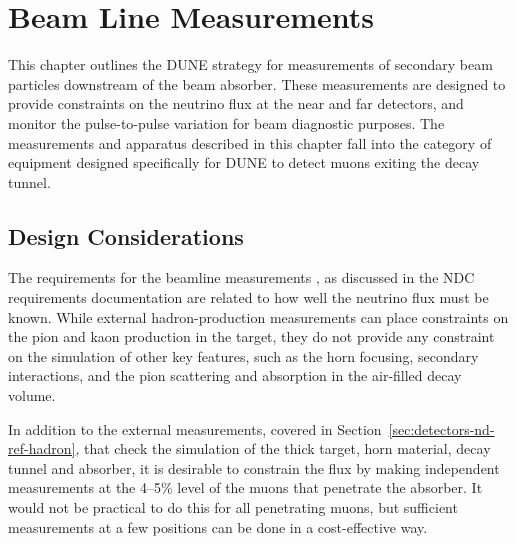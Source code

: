 \section{Beam Line Measurements} 
\label{sec:detectors-nd-ref-blm}

This chapter outlines the DUNE strategy for measurements of secondary
beam particles downstream of  the beam absorber. 
These measurements are designed to provide constraints 
on the neutrino flux at the near and far
detectors, and monitor the pulse-to-pulse variation
 for beam diagnostic purposes. 
The measurements and apparatus described in this chapter fall into
the category of equipment designed specifically for DUNE to
detect muons exiting the decay tunnel. 

\subsection{Design Considerations}
\label{subsec:detectors-nd-blm-design}

The requirements for the beamline measurements
%
, as discussed in the NDC requirements documentation\cite{lbnfdune-cdr-req} 
%
are related to how well the neutrino flux must be known.
While external hadron-production measurements can place 
constraints on the pion and kaon production in the target, they do not 
provide any constraint on the simulation of other key features, such 
as the horn focusing, secondary interactions, and the 
pion scattering and absorption in the air-filled decay volume. 

In addition to the external measurements, covered in
Section~\ref{sec:detectors-nd-ref-hadron}, that check the
simulation of the thick target, horn material, decay tunnel and
absorber, it is desirable to constrain the flux by making independent
measurements at the 4--5\% level of the muons that penetrate the
absorber. It would not be practical to do this for all penetrating
muons, but sufficient measurements at a few positions can be done in a
cost-effective way.
%


